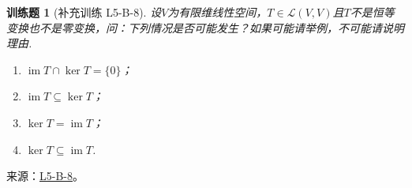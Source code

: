 \documentclass[UTF8,12pt,a4paper,fontset=fandol]{ctexart}
\newtheorem{exercise}{训练题}[section]
\begin{document}
\begin{exercise}[补充训练 L5-B-8]\label{prob:L5-B-8}
设$V$为有限维线性空间，$T\in \mathcal{L}(V,V)$且$T$不是恒等变换也不是零变换，问：下列情况是否可能发生？如果可能请举例，不可能请说明理由.
        \begin{enumerate}
            \item $\operatorname{im} T \cap \ker T = \{0\}$；

            \item $\operatorname{im} T \subseteq \ker T$；

            \item $\ker T = \operatorname{im} T$；

            \item $\ker T \subseteq \operatorname{im} T$.
        \end{enumerate}
\end{exercise}
\noindent 来源：\href{https://github.com/yhwu-is/Linear-Algebra-Left-Undone/blob/new/%E8%AE%B2%E4%B9%89/%E4%B8%93%E9%A2%98/5%20%E7%BA%BF%E6%80%A7%E6%98%A0%E5%B0%84.tex}{L5-B-8}。
\end{document}
